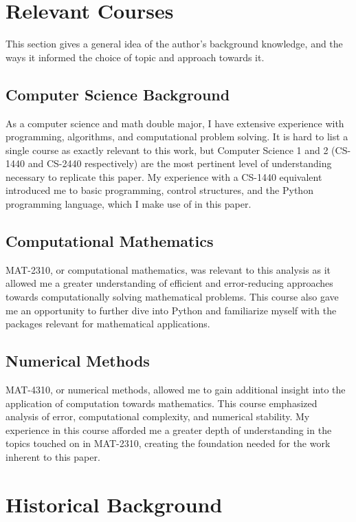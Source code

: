 \documentclass{article}
\begin{document}
\section{Relevant Courses}
This section gives a general idea of the author's background knowledge, and the ways it informed the choice of topic and approach towards it.

\subsection{Computer Science Background}
As a computer science and math double major, I have extensive experience with programming, algorithms, and computational problem solving. It is hard to list a single course as exactly relevant to this work, but Computer Science 1 and 2 (CS-1440 and CS-2440 respectively) are the most pertinent level of understanding necessary to replicate this paper. My experience with a CS-1440 equivalent introduced me to basic programming, control structures, and the Python programming language, which I make use of in this paper.

\subsection{Computational Mathematics}
MAT-2310, or computational mathematics, was relevant to this analysis as it allowed me a greater understanding of efficient and error-reducing approaches towards computationally solving mathematical problems. This course also gave me an opportunity to further dive into Python and familiarize myself with the packages relevant for mathematical applications.

\subsection{Numerical Methods}
MAT-4310, or numerical methods, allowed me to gain additional insight into the application of computation towards mathematics. This course emphasized analysis of error, computational complexity, and numerical stability. My experience in this course afforded me a greater depth of understanding in the topics touched on in MAT-2310, creating the foundation needed for the work inherent to this paper.

\pagebreak

\section{Historical Background}
\end{document}
